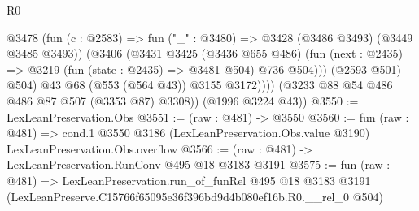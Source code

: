 \begin{lexlean}{R0}
\begin{coremodule}
                @3478
                  (fun (c : @2583) => fun ("_" : @3480) => @3428 (@3486 @3493) (@3449 @3485 @3493))
                  (@3406
                    (@3431
                      @3425
                      (@3436 @655 @486)
                      (fun (next : @2435) => @3219 (fun (state : @2435) => @3481 @504) @736 @504)))
                  (@2593 @501)
                  @504)
                @43
                @68
                (@553 (@564 @43))
                @3155
                @3172))))
        (@3233 @88 @54 @486 @486 @87 @507 (@3353 @87) @3308))
      (@1996 @3224 @43))
@3550 := LexLeanPreservation.Obs
@3551 := (raw : @481) -> @3550
@3560 := fun (raw : @481) =>
  cond.{1} @3550 @3186 (LexLeanPreservation.Obs.value @3190) LexLeanPreservation.Obs.overflow
@3566 := (raw : @481) -> LexLeanPreservation.RunConv @495 @18 @3183 @3191
@3575 := fun (raw : @481) =>
  LexLeanPreservation.run_of_funRel
    @495
    @18
    @3183
    @3191
    (LexLeanPreserve.C15766f65095e36f396bd9d4b080ef16b.R0.__rel_0 @504)
\end{coremodule}
\end{lexlean}
